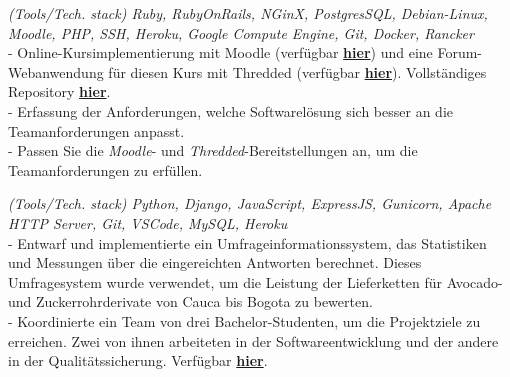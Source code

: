 \documentclass[]{CV-JuanCamiloFlorez}
\begin{document}
\begin{minipage}[t]{0.66\textwidth}
    \focusareas{}
    \textit{(Tools/Tech. stack) Ruby, RubyOnRails, NGinX, PostgresSQL, Debian-Linux, Moodle, PHP, SSH, Heroku, Google Compute Engine, Git, Docker, Rancker} \\
        - Online-Kursimplementierung mit Moodle (verfügbar \textbf{\href{https://gitlab.com/VanJFlorez/animal-modeling-ethics/tree/master/docs/4 LMS build}{hier}}) und eine Forum-Webanwendung für diesen Kurs mit Thredded (verfügbar \textbf{\href{https://gitlab.com/VanJFlorez/animal-modeling-ethics/blob/master/docs/3\%20Social\%20WebApp/CP\%20etica\%20animal\%20webApp.pdf}{hier}}). Vollständiges Repository \textbf{\href{https://gitlab.com/VanJFlorez/animal-modeling-ethics/}{hier}}. \\
        - Erfassung der Anforderungen, welche Softwarelösung sich besser an die Teamanforderungen anpasst. \\
        - Passen Sie die \textit{Moodle}- und \textit{Thredded}-Bereitstellungen an, um die Teamanforderungen zu erfüllen. \\
        \sectionsep

    \focusareas{}
    \textit{(Tools/Tech. stack) Python, Django, JavaScript, ExpressJS, Gunicorn, Apache HTTP Server, Git, VSCode, MySQL, Heroku} \\
        - Entwarf und implementierte ein Umfrageinformationssystem, das Statistiken und Messungen über die eingereichten Antworten berechnet. Dieses Umfragesystem wurde verwendet, um die Leistung der Lieferketten für Avocado- und Zuckerrohrderivate von Cauca bis Bogota zu bewerten. \\
        - Koordinierte ein Team von drei Bachelor-Studenten, um die Projektziele zu erreichen. Zwei von ihnen arbeiteten in der Softwareentwicklung und der andere in der Qualitätssicherung. Verfügbar \textbf{\href{https://gitlab.com/VanJFlorez/sepro-webapp}{hier}}. \\
        \sectionsep

 
\vspace{\topsep} %



\end{minipage}
\end{document}
